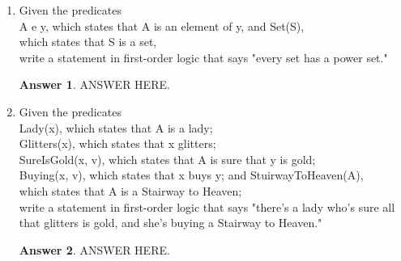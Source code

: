 \documentclass[a4paper]{article}
\renewcommand{\(}{\left(}
\renewcommand{\)}{\right)}
\theoremstyle{plain}
\theoremstyle{plain}
\theoremstyle{definition}
\newtheorem*{answer}{Answer}
\begin{document}
\begin{enumerate}[label*=\roman*.,ref=\roman*]
\item Given the predicates \\
A e y, which states that A is an element of y, and Set(S),  \\
which states that S is a set, \\
write a statement in first-order logic that says "every set has a power set."
\begin{shaded}
\begin{answer}
ANSWER HERE.
\end{answer}
\end{shaded}

\item Given the predicates \\
Lady(x), which states that A is a lady; \\
Glitters(x), which states that x glitters; \\
SureIsGold(x, v), which states that A is sure that y is gold; \\
Buying(x, v), which states that x buys y; and StuirwayToHeaven(A),  \\
which states that A is a Stairway to Heaven; \\
write a statement in first-order logic that says "there's a lady who's sure all that glitters is gold, and she's buying a Stairway to Heaven."
\begin{shaded}
\begin{answer}
ANSWER HERE.
\end{answer}
\end{shaded}

\end{enumerate}
\end{document}

